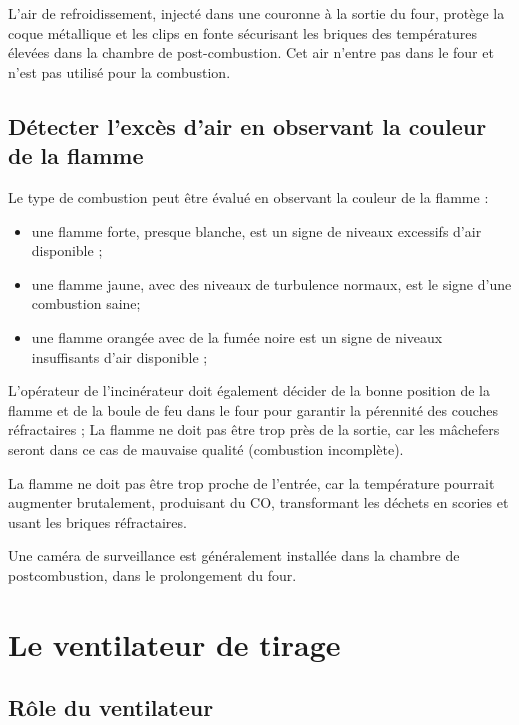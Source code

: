 \vspace{0.3cm}

L'air de refroidissement, injecté dans une couronne à la sortie du four, protège la coque métallique et les clips en fonte sécurisant les briques des températures élevées dans la chambre de post-combustion. Cet air n'entre pas dans le four et n'est pas utilisé pour la combustion.


\subsection{Détecter l'excès d'air en observant la couleur de la flamme}

Le type de combustion peut être évalué en observant la couleur de la flamme :
\begin{itemize}
    \item une flamme forte, presque blanche, est un signe de niveaux excessifs d'air disponible ;
    \item une flamme jaune, avec des niveaux de turbulence normaux, est le signe d'une combustion saine;
    \item une flamme orangée avec de la fumée noire est un signe de niveaux insuffisants d'air disponible ;
\end{itemize}

L'opérateur de l'incinérateur doit également décider de la bonne position de la flamme et de la boule de feu dans le four pour garantir la pérennité des couches réfractaires ;
La flamme ne doit pas être trop près de la sortie, car les mâchefers seront dans ce cas de mauvaise qualité (combustion incomplète).

\vspace{0.3cm}
La flamme ne doit pas être trop proche de l'entrée, car la température pourrait augmenter brutalement, produisant du CO, transformant les déchets en scories et usant les briques réfractaires.
\vspace{0.3cm}

Une caméra de surveillance est généralement installée dans la chambre de postcombustion, dans le prolongement du four.

\section{Le ventilateur de tirage}

\subsection{Rôle du ventilateur}

